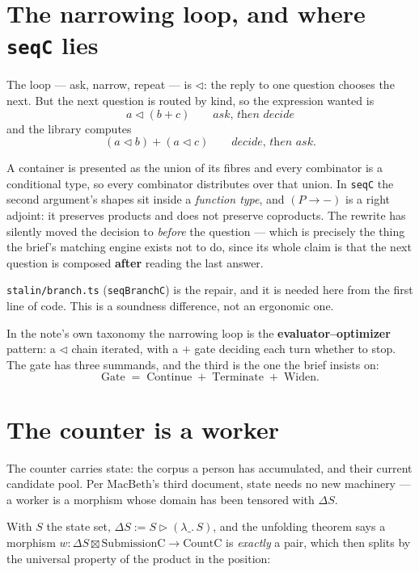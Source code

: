 \documentclass[11pt,a4paper]{article}
\newcommand{\seq}{\mathbin{\triangleleft}}
\newcommand{\ten}{\mathbin{\boxtimes}}
\begin{document}
\section{The narrowing loop, and where \texttt{seqC} lies}

The loop --- ask, narrow, repeat --- is $\seq$: the reply to one question
chooses the next. But the next question is routed by kind, so the expression
wanted is
\[
  a \seq (b + c) \qquad \textit{ask, then decide}
\]
and the library computes
\[
  (a \seq b) + (a \seq c) \qquad \textit{decide, then ask.}
\]

\begin{alarmbox}
A container is presented as the union of its fibres and every combinator is a
conditional type, so every combinator distributes over that union. In
\texttt{seqC} the second argument's shapes sit inside a \emph{function type}, and
$(P \to -)$ is a right adjoint: it preserves products and does not preserve
coproducts. The rewrite has silently moved the decision to \emph{before} the
question --- which is precisely the thing the brief's matching engine exists not
to do, since its whole claim is that the next question is composed
\textbf{after} reading the last answer.

\texttt{stalin/branch.ts} (\texttt{seqBranchC}) is the repair, and it is needed
here from the first line of code. This is a soundness difference, not an
ergonomic one.
\end{alarmbox}

In the note's own taxonomy the narrowing loop is the
\textbf{evaluator--optimizer} pattern: a $\seq$ chain iterated, with a $+$ gate
deciding each turn whether to stop. The gate has three summands, and the third is
the one the brief insists on:
\[
  \mathrm{Gate} \;=\; \mathrm{Continue} \;+\; \mathrm{Terminate} \;+\; \mathrm{Widen}.
\]

\section{The counter is a worker}

The counter carries state: the corpus a person has accumulated, and their current
candidate pool. Per MacBeth's third document, state needs no new machinery --- a
worker is a morphism whose domain has been tensored with $\Delta S$.

With $S$ the state set, $\Delta S := S \triangleright (\lambda\_.\,S)$, and the
unfolding theorem says a morphism
$w : \Delta S \ten \mathrm{SubmissionC} \to \mathrm{CountC}$ is \emph{exactly} a
pair, which then splits by the universal property of the product in the position:
\end{document}
